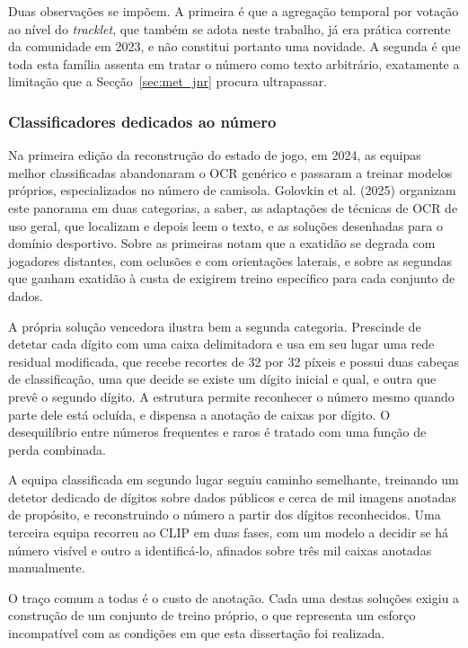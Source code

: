 Duas observações se impõem. A primeira é que a agregação temporal por votação ao nível do
\emph{tracklet}, que também se adota neste trabalho, já era prática corrente da comunidade em
2023, e não constitui portanto uma novidade. A segunda é que toda esta família assenta em
tratar o número como texto arbitrário, exatamente a limitação que a Secção~\ref{sec:met_jnr}
procura ultrapassar.

\subsubsection*{Classificadores dedicados ao número}

Na primeira edição da reconstrução do estado de jogo, em 2024, as equipas melhor classificadas
abandonaram o OCR genérico e passaram a treinar modelos próprios, especializados no número de
camisola. Golovkin et al. (2025) organizam este panorama em duas categorias, a saber, as
adaptações de técnicas de OCR de uso geral, que localizam e depois leem o texto, e as soluções
desenhadas para o domínio desportivo. Sobre as primeiras notam que a exatidão se degrada com
jogadores distantes, com oclusões e com orientações laterais, e sobre as segundas que ganham
exatidão à custa de exigirem treino específico para cada conjunto de dados.

A própria solução vencedora ilustra bem a segunda categoria. Prescinde de detetar cada dígito
com uma caixa delimitadora e usa em seu lugar uma rede residual modificada, que recebe recortes
de 32 por 32 píxeis e possui duas cabeças de classificação, uma que decide se existe um dígito
inicial e qual, e outra que prevê o segundo dígito. A estrutura permite reconhecer o número
mesmo quando parte dele está ocluída, e dispensa a anotação de caixas por dígito. O
desequilíbrio entre números frequentes e raros é tratado com uma função de perda combinada.

A equipa classificada em segundo lugar seguiu caminho semelhante, treinando um detetor dedicado
de dígitos sobre dados públicos e cerca de mil imagens anotadas de propósito, e reconstruindo o
número a partir dos dígitos reconhecidos. Uma terceira equipa recorreu ao CLIP em duas fases,
com um modelo a decidir se há número visível e outro a identificá-lo, afinados sobre três mil
caixas anotadas manualmente.

O traço comum a todas é o custo de anotação. Cada uma destas soluções exigiu a construção de um
conjunto de treino próprio, o que representa um esforço incompatível com as condições em que
esta dissertação foi realizada.

